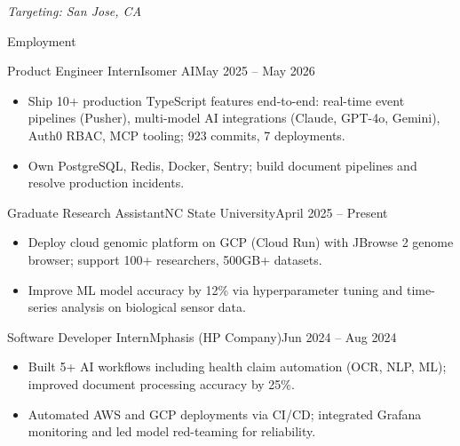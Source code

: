 \documentclass[]{mcdowellcv}
\begin{document}
\makeheader
\begin{center}\vspace{-12pt}\small\textit{Targeting: San Jose, CA}\end{center}\vspace{-10pt}

\begin{cvsection}{Employment}
  \begin{cvsubsection}{Product Engineer Intern}{Isomer AI}{May 2025 -- May 2026}
    \begin{itemize}
      \item Ship 10+ production TypeScript features end-to-end: real-time event pipelines (Pusher), multi-model AI integrations (Claude, GPT-4o, Gemini), Auth0 RBAC, MCP tooling; 923 commits, 7 deployments.
      \item Own PostgreSQL, Redis, Docker, Sentry; build document pipelines and resolve production incidents.
    \end{itemize}
    \vspace{-1.5pt}
  \end{cvsubsection}

  \begin{cvsubsection}{Graduate Research Assistant}{NC State University}{April 2025 -- Present}
    \begin{itemize}
      \item Deploy cloud genomic platform on GCP (Cloud Run) with JBrowse 2 genome browser; support 100+ researchers, 500GB+ datasets.
      \item Improve ML model accuracy by 12\% via hyperparameter tuning and time-series analysis on biological sensor data.
    \end{itemize}
    \vspace{-1.5pt}
  \end{cvsubsection}

  \begin{cvsubsection}{Software Developer Intern}{Mphasis (HP Company)}{Jun 2024 -- Aug 2024}
    \begin{itemize}
      \item Built 5+ AI workflows including health claim automation (OCR, NLP, ML); improved document processing accuracy by 25\%.
      \item Automated AWS and GCP deployments via CI/CD; integrated Grafana monitoring and led model red-teaming for reliability.
    \end{itemize}
    \vspace{-1.5pt}
  \end{cvsubsection}


\end{cvsection}
\end{document}

